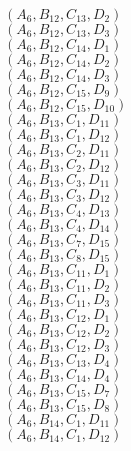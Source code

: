\documentclass[14pt]{article}
\begin{document}
    $({A}_{6}, {B}_{12}, {C}_{13}, {D}_{2}) $ \\ 
    $({A}_{6}, {B}_{12}, {C}_{13}, {D}_{3}) $ \\ 
    $({A}_{6}, {B}_{12}, {C}_{14}, {D}_{1}) $ \\ 
    $({A}_{6}, {B}_{12}, {C}_{14}, {D}_{2}) $ \\ 
    $({A}_{6}, {B}_{12}, {C}_{14}, {D}_{3}) $ \\ 
    $({A}_{6}, {B}_{12}, {C}_{15}, {D}_{9}) $ \\ 
    $({A}_{6}, {B}_{12}, {C}_{15}, {D}_{10}) $ \\ 
    $({A}_{6}, {B}_{13}, {C}_{1}, {D}_{11}) $ \\ 
    $({A}_{6}, {B}_{13}, {C}_{1}, {D}_{12}) $ \\ 
    $({A}_{6}, {B}_{13}, {C}_{2}, {D}_{11}) $ \\ 
    $({A}_{6}, {B}_{13}, {C}_{2}, {D}_{12}) $ \\ 
    $({A}_{6}, {B}_{13}, {C}_{3}, {D}_{11}) $ \\ 
    $({A}_{6}, {B}_{13}, {C}_{3}, {D}_{12}) $ \\ 
    $({A}_{6}, {B}_{13}, {C}_{4}, {D}_{13}) $ \\ 
    $({A}_{6}, {B}_{13}, {C}_{4}, {D}_{14}) $ \\ 
    $({A}_{6}, {B}_{13}, {C}_{7}, {D}_{15}) $ \\ 
    $({A}_{6}, {B}_{13}, {C}_{8}, {D}_{15}) $ \\ 
    $({A}_{6}, {B}_{13}, {C}_{11}, {D}_{1}) $ \\ 
    $({A}_{6}, {B}_{13}, {C}_{11}, {D}_{2}) $ \\ 
    $({A}_{6}, {B}_{13}, {C}_{11}, {D}_{3}) $ \\ 
    $({A}_{6}, {B}_{13}, {C}_{12}, {D}_{1}) $ \\ 
    $({A}_{6}, {B}_{13}, {C}_{12}, {D}_{2}) $ \\ 
    $({A}_{6}, {B}_{13}, {C}_{12}, {D}_{3}) $ \\ 
    $({A}_{6}, {B}_{13}, {C}_{13}, {D}_{4}) $ \\ 
    $({A}_{6}, {B}_{13}, {C}_{14}, {D}_{4}) $ \\ 
    $({A}_{6}, {B}_{13}, {C}_{15}, {D}_{7}) $ \\ 
    $({A}_{6}, {B}_{13}, {C}_{15}, {D}_{8}) $ \\ 
    $({A}_{6}, {B}_{14}, {C}_{1}, {D}_{11}) $ \\ 
    $({A}_{6}, {B}_{14}, {C}_{1}, {D}_{12}) $ \\ 
\end{document}
